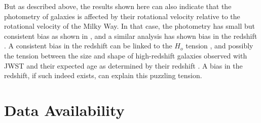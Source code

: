 \documentclass[final,5p,times,twocolumn]{article}
\begin{document}
But as described above, the results shown here can also indicate that the photometry of galaxies is affected by their rotational velocity relative to the rotational velocity of the Milky Way. In that case, the photometry has small but consistent bias as shown in \citep{mcadam2023asymmetry,shamir2017large,shamir2020asymmetry}, and a similar analysis has shown bias in the redshift \citep{shamir2024simple,shamir2024empirical}. A consistent bias in the redshift can be linked to the $H_o$ tension \citep{capozziello2024critical,vagnozzi2020new,rameez2021there,di2021realm,aloni2022step,davis2019can}, and possibly the tension between the size and shape of high-redshift galaxies observed with JWST and their expected age as determined by their redshift \citep{glazebrook2024massive}. A bias in the redshift, if such indeed exists, can explain this puzzling tension.







   



\section*{Data Availability}
\end{document}
